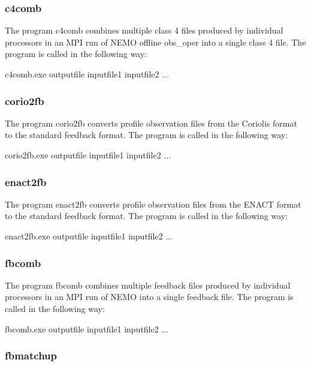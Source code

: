\documentclass[../tex_main/NEMO_manual]{subfiles}
\begin{document}
\subsubsection{c4comb}

The program c4comb combines multiple class 4 files produced by individual processors in an
MPI run of NEMO offline obs\_oper into a single class 4 file. The program is called in the following way:


\footnotesize
\begin{cmds}
c4comb.exe outputfile inputfile1 inputfile2 ...
\end{cmds}

\subsubsection{corio2fb}

The program corio2fb converts profile observation files from the Coriolis format to the
standard feedback format. The program is called in the following way:

\footnotesize
\begin{cmds}
corio2fb.exe outputfile inputfile1 inputfile2 ...
\end{cmds}

\subsubsection{enact2fb}

The program enact2fb converts profile observation files from the ENACT format to the standard
feedback format. The program is called in the following way:

\footnotesize
\begin{cmds}
enact2fb.exe outputfile inputfile1 inputfile2 ...
\end{cmds}

\subsubsection{fbcomb}

The program fbcomb combines multiple feedback files produced by individual processors in an
MPI run of NEMO into a single feedback file. The program is called in the following way:

\footnotesize
\begin{cmds}
fbcomb.exe outputfile inputfile1 inputfile2 ...
\end{cmds}

\subsubsection{fbmatchup}
\end{document}
